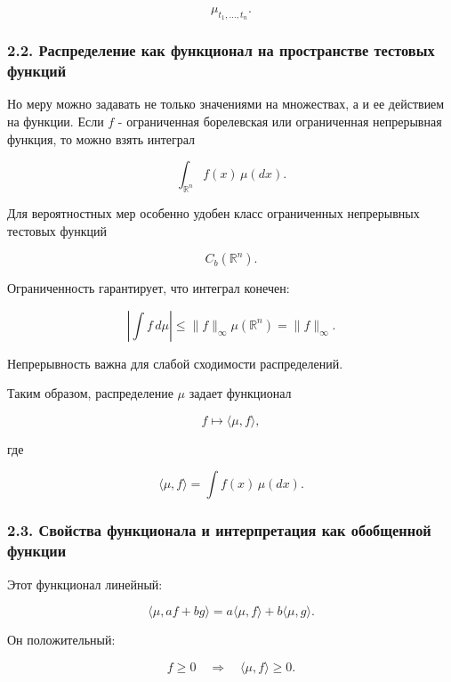 \documentclass[
  11pt,
  a4paper,
]{article}
\begin{document}
\[
\mu_{t_1,\ldots,t_n}.
\]

\subsubsection{2.2. Распределение как функционал на пространстве
тестовых
функций}\label{ux440ux430ux441ux43fux440ux435ux434ux435ux43bux435ux43dux438ux435-ux43aux430ux43a-ux444ux443ux43dux43aux446ux438ux43eux43dux430ux43b-ux43dux430-ux43fux440ux43eux441ux442ux440ux430ux43dux441ux442ux432ux435-ux442ux435ux441ux442ux43eux432ux44bux445-ux444ux443ux43dux43aux446ux438ux439}

Но меру можно задавать не только значениями на множествах, а и ее
действием на функции. Если \(f\) - ограниченная борелевская или
ограниченная непрерывная функция, то можно взять интеграл

\[
\int_{\mathbb R^n} f(x)\,\mu(dx).
\]

Для вероятностных мер особенно удобен класс ограниченных непрерывных
тестовых функций

\[
C_b(\mathbb R^n).
\]

Ограниченность гарантирует, что интеграл конечен:

\[
\left|\int f\,d\mu\right|
\le
\|f\|_\infty\mu(\mathbb R^n)
=
\|f\|_\infty.
\]

Непрерывность важна для слабой сходимости распределений.

Таким образом, распределение \(\mu\) задает функционал

\[
f\mapsto \langle \mu,f\rangle,
\]

где

\[
\langle \mu,f\rangle
=
\int f(x)\,\mu(dx).
\]

\subsubsection{2.3. Свойства функционала и интерпретация как обобщенной
функции}\label{ux441ux432ux43eux439ux441ux442ux432ux430-ux444ux443ux43dux43aux446ux438ux43eux43dux430ux43bux430-ux438-ux438ux43dux442ux435ux440ux43fux440ux435ux442ux430ux446ux438ux44f-ux43aux430ux43a-ux43eux431ux43eux431ux449ux435ux43dux43dux43eux439-ux444ux443ux43dux43aux446ux438ux438}

Этот функционал линейный:

\[
\langle \mu,af+bg\rangle
=
a\langle\mu,f\rangle+b\langle\mu,g\rangle.
\]

Он положительный:

\[
f\ge0
\quad\Rightarrow\quad
\langle\mu,f\rangle\ge0.
\]
\end{document}
